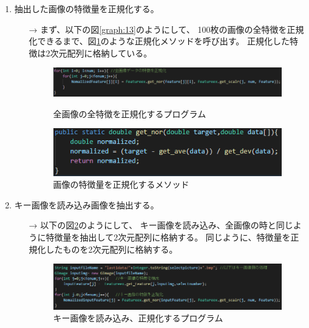 \begin{enumerate}
  \item 抽出した画像の特徴量を正規化する。
  \begin{itemize}
    \item[→] まず、以下の図\ref{graph:13}のようにして、
    100枚の画像の全特徴を正規化できるまで、図\ref{graph:14}のような正規化メソッドを呼び出す。
    正規化した特徴は2次元配列に格納している。
    \begin{figure}[htbp]
      \begin{minipage}[t]{0.45\hsize}
        \includegraphics[scale=0.4]{画像の特徴量を正規化する.PNG}
        \centering
        \caption{全画像の全特徴を正規化するプログラム}
        \label{graph:13}
      \end{minipage}
      \begin{minipage}[t]{0.45\hsize}
        \includegraphics[scale=0.4]{画像の特徴量を正規化する1.PNG}
        \centering
        \caption{画像の特徴量を正規化するメソッド}
        \label{graph:14}
      \end{minipage}
    \end{figure}
  \end{itemize}

  \item キー画像を読み込み画像を抽出する。
  \begin{itemize}
    \item[→] 以下の図\ref{graph:15}のようにして、
    キー画像を読み込み、全画像の時と同じように特徴量を抽出して2次元配列に格納する。
    同じように、特徴量を正規化したものを2次元配列に格納する。
    \begin{figure}[htbp]
      \begin{minipage}[t]{\hsize}
        \includegraphics[scale=0.4]{キー画像読み込み.PNG}
        \centering
        \caption{キー画像を読み込み、正規化するプログラム}
        \label{graph:15}
      \end{minipage}
    \end{figure}
  \end{itemize}


\end{enumerate}
